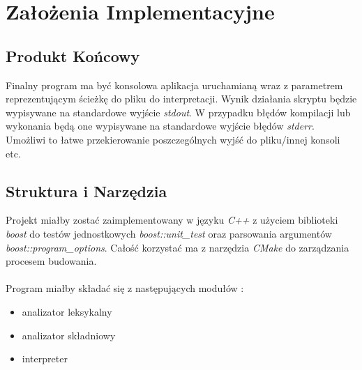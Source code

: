\documentclass[11pt]{article} %
\begin{document}
\section{Założenia Implementacyjne}
\subsection{Produkt Końcowy}
Finalny program ma być konsolowa aplikacja uruchamianą wraz z parametrem reprezentującym ścieżkę do pliku do interpretacji. Wynik działania skryptu będzie wypisywane na standardowe wyjście \textsl{stdout}. W przypadku błędów kompilacji lub wykonania będą one wypisywane na standardowe wyjście błędów \textsl{stderr}. Umożliwi to łatwe przekierowanie poszczególnych wyjść do pliku/innej konsoli etc.
\subsection{Struktura i Narzędzia}
Projekt miałby zostać zaimplementowany w języku \textit{C++} z użyciem biblioteki \textit{boost} do testów jednostkowych \textit{boost::unit\_test} oraz parsowania argumentów \textit{boost::program\_options}. Całość korzystać ma z narzędzia \textit{CMake} do zarządzania procesem budowania.
\paragraph{}
Program miałby składać się z następujących modułów : 
\begin{itemize}
	\item analizator leksykalny
	\item analizator składniowy
	\item interpreter
\end{itemize}
\end{document}
